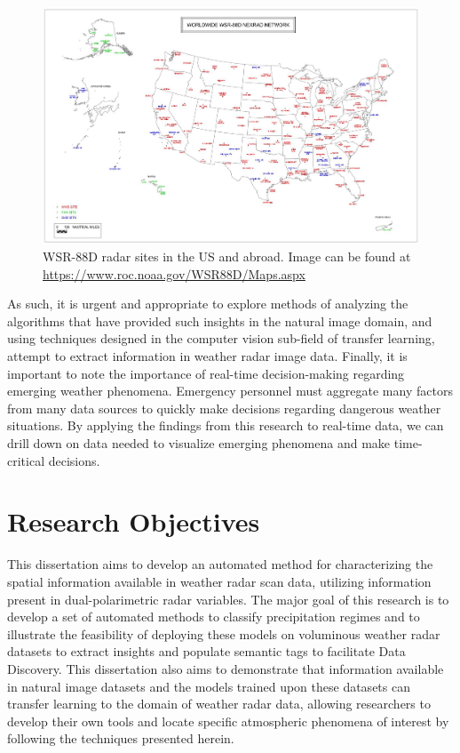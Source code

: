 \begin{figure}[h]
	\centering
	\includegraphics[width=\textwidth]{./thesis_code/plots/noaa_wsr88d_map.jpg}
	\caption{WSR-88D radar sites in the US and abroad. Image can be found at \url{https://www.roc.noaa.gov/WSR88D/Maps.aspx}}
	\label{fig:introduction_wsr88d-map}
\end{figure}

As such, it is urgent and appropriate to explore methods of analyzing the algorithms that have provided such insights in the natural image domain, and using techniques designed in the computer vision sub-field of transfer learning, attempt to extract information in weather radar image data.
Finally, it is important to note the importance of real-time decision-making regarding emerging weather phenomena.
Emergency personnel must aggregate many factors from many data sources to quickly make decisions regarding dangerous weather situations.
By applying the findings from this research to real-time data, we can drill down on data needed to visualize emerging phenomena and make time-critical decisions.

\section{Research Objectives}
\label{sec:introduction_objectives}

This dissertation aims to develop an automated method for characterizing the spatial information available in weather radar scan data, utilizing information present in dual-polarimetric radar variables.
The major goal of this research is to develop a set of automated methods to classify precipitation regimes and to illustrate the feasibility of deploying these models on voluminous weather radar datasets to extract insights and populate semantic tags to facilitate Data Discovery.
This dissertation also aims to demonstrate that information available in natural image datasets and the models trained upon these datasets can transfer learning to the domain of weather radar data, allowing researchers to develop their own tools and locate specific atmospheric phenomena of interest by following the techniques presented herein.

